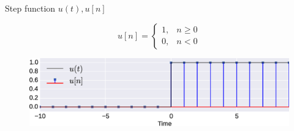 \documentclass[aspectratio=169]{beamer}
\begin{document}
\begin{frame}[t]
\end{frame}


\begin{frame}{Step function $u(t), u[n]$}

\[ u[n] = \begin{cases} 1, & n \geq 0 \\ 0, & n < 0\end{cases} \]

\begin{figure}
\includegraphics[width=\textwidth]{img/step.eps}
\end{figure}

\end{frame}



\begin{frame}[t]
\end{frame}










\end{document}

